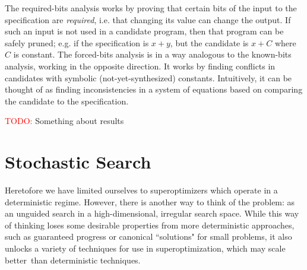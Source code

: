 \documentclass[12pt,twoside]{reedthesis}
\newcommand{\red}[1]{\textcolor{red}{#1}}
\newcommand{\addressed}[2]{{#1}}
\begin{document}
The required-bits analysis works by proving that certain bits of the input to the specification are \textit{required}, i.e. that changing its value can change the output.
    If such an input is not used in a candidate program, then that program can be safely pruned;
        e.g. if the specification is $x + y$, but the candidate is $x + C$ where $C$ is constant.
The forced-bits analysis is in a way analogous to the known-bits analysis, working in the opposite direction.
    It works by finding conflicts in candidates with symbolic (not-yet-synthesized) constants.
    Intuitively, it can be thought of as finding inconsistencies in a system of equations based on comparing the candidate to the specification. %
    
\red{TODO:} Something about results
    

\chapter{Stochastic Search}
Heretofore we have limited ourselves to superoptimizers which operate in a deterministic regime.
However, there is another way to think of the problem: as an unguided search in a high-dimensional, irregular search space.
While this way of thinking loses some desirable properties from more deterministic approaches, such as guaranteed progress or canonical ``solutions" for small problems, it also unlocks a variety of techniques for use in superoptimization, which may scale better\footnotemark\, than deterministic techniques.
    
\end{document}

